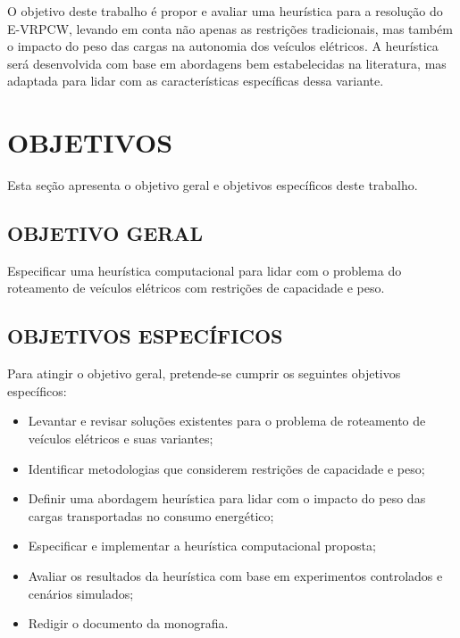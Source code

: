 \documentclass{ufscThesis}
\begin{document}
O objetivo deste trabalho é propor e avaliar uma heurística para a resolução do E-VRPCW, levando em conta não apenas as restrições tradicionais, mas também o impacto do peso das cargas na autonomia dos veículos elétricos. A heurística será desenvolvida com base em abordagens bem estabelecidas na literatura, mas adaptada para lidar com as características específicas dessa variante.



\section{OBJETIVOS}

    Esta seção apresenta o objetivo geral e objetivos específicos deste trabalho.

	\subsection{OBJETIVO GERAL}
	
	Especificar uma heurística computacional para lidar com o problema do roteamento de veículos elétricos com restrições de capacidade e peso.
	
    \subsection{OBJETIVOS ESPECÍFICOS}  
    Para atingir o objetivo geral, pretende-se cumprir os seguintes objetivos específicos:  
    \begin{itemize}  
        \item Levantar e revisar soluções existentes para o problema de roteamento de veículos elétricos e suas variantes;  
        
        \item Identificar metodologias que considerem restrições de capacidade e peso;  
        
        \item Definir uma abordagem heurística para lidar com o impacto do peso das cargas transportadas no consumo energético;  
        
        \item Especificar e implementar a heurística computacional proposta;  
        
        \item Avaliar os resultados da heurística com base em experimentos controlados e cenários simulados;  
        
        \item Redigir o documento da monografia.  
    \end{itemize}
\end{document}
